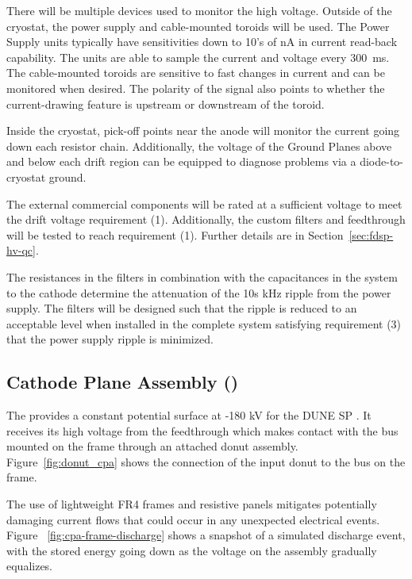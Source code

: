 There will be multiple devices used to monitor the high voltage.  Outside of the cryostat, the power supply and cable-mounted toroids will be used.  The Power Supply units typically have sensitivities down to 10's of nA in current read-back capability.  The units are able to sample the current and voltage every \SI{300}{ms}.  The cable-mounted toroids are sensitive to fast changes in current and can be monitored when desired.  The polarity of the signal also points to whether the current-drawing feature is upstream or downstream of the toroid.

Inside the cryostat, pick-off points near the anode will monitor the current going down each resistor chain.  Additionally, the voltage of the Ground Planes above and below each drift region can be equipped to diagnose problems via a diode-to-cryostat ground.

The external commercial  components will be rated at a sufficient voltage to meet the drift voltage requirement (1).  Additionally, the custom filters and feedthrough will be tested to reach requirement (1).  Further details are in Section~\ref{sec:fdsp-hv-qc}.

The resistances in the filters in combination with the capacitances in the  system to the cathode determine the attenuation of the 10s kHz ripple from the power supply.  The filters will be designed such that the ripple is reduced to an acceptable level when installed in the complete system satisfying requirement (3) that the power supply ripple is minimized.

\subsection{Cathode Plane Assembly ()}

The  provides a constant potential surface at -180 kV for the DUNE SP .  It receives its high voltage from the  feedthrough which makes contact with the  bus mounted on the  frame through an attached donut assembly. Figure~\ref{fig:donut_cpa} shows the connection of the  input donut to the  bus on the  frame. 

The use of lightweight FR4 frames and resistive panels mitigates potentially damaging current flows that could occur in any unexpected electrical events.  Figure ~\ref{fig:cpa-frame-discharge} shows a snapshot of a simulated discharge event, with the stored energy going down as the voltage on the assembly gradually equalizes.

